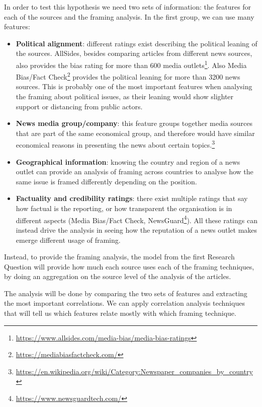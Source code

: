In order to test this hypothesis we need two sets of information: the features for each of the sources and the framing analysis.
In the first group, we can use many features:

\begin{itemize}
    \item \textbf{Political alignment}: different ratings exist describing the political leaning of the sources. AllSides, besides comparing articles from different news sources, also provides the bias rating for more than 600 media outlets\footnote{\url{https://www.allsides.com/media-bias/media-bias-ratings}}. Also Media Bias/Fact Check\footnote{\url{https://mediabiasfactcheck.com/}} provides the political leaning for more than 3200 news sources. This is probably one of the most important features when analysing the framing about political issues, as their leaning would show slighter support or distancing from public actors.
    \item \textbf{News media group/company}: this feature groups together media sources that are part of the same economical group, and therefore would have similar economical reasons in presenting the news about certain topics.\footnote{\url{https://en.wikipedia.org/wiki/Category:Newspaper_companies_by_country}} %
    \item \textbf{Geographical information}: knowing the country and region of a news outlet can provide an analysis of framing across countries to analyse how the same issue is framed differently depending on the position.
    \item \textbf{Factuality and credibility ratings}: there exist multiple ratings that say how factual is the reporting, or how transparent the organisation is in different aspects (Media Bias/Fact Check, NewsGuard\footnote{\url{https://www.newsguardtech.com/}}). All these ratings can instead drive the analysis in seeing how the reputation of a news outlet makes emerge different usage of framing.
\end{itemize}

Instead, to provide the framing analysis, the model from the first Research Question will provide how much each source uses each of the framing techniques, by doing an aggregation on the source level of the analysis of the articles.

The analysis will be done by comparing the two sets of features and extracting the most important correlations.
We can apply correlation analysis techniques that will tell us which features relate mostly with which framing technique. 

